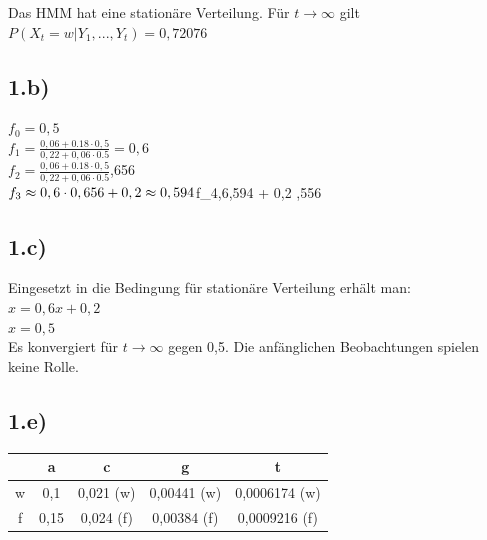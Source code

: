 \documentclass[a4paper]{article}
\begin{document}
Das HMM hat eine stationäre Verteilung. Für $t\rightarrow \infty$ gilt\\
$ P(X_t=w|Y_1,...,Y_t)=0,72076$
\subsection*{1.b)}
$f_0 = 0,5$\\
$f_1=\frac{0,06+0.18\cdot 0,5}{0,22+0,06\cdot 0.5} = 0,6$\\
$f_2=\frac{0,06+0.18\cdot 0,5}{0,22+0,06\cdot 0.5}$,656\\
$f_3\approx 0,6\cdot 0,656 + 0,2 \approx 0,594\\
$f_4,6,594 + 0,2 ,556\\

\subsection*{1.c)}
Eingesetzt in die Bedingung für stationäre Verteilung erhält man:\\
$x=0,6x+0,2$\\
$x=0,5$\\
Es konvergiert für $t\rightarrow \infty$ gegen 0,5. Die anfänglichen Beobachtungen spielen keine Rolle.

\subsection*{1.e)}
\begin{tabular}{c|cccc}
    & a 		& c 			& g 			& t 			\\
\hline
w	& 0,1		& 0,021 (w)		& 0,00441 (w)		& 0,0006174 (w)	\\
f 	& 0,15		& 0,024 (f)		& 0,00384 (f)		& 0,0009216 (f)	\\
\end{tabular}
\end{document}
